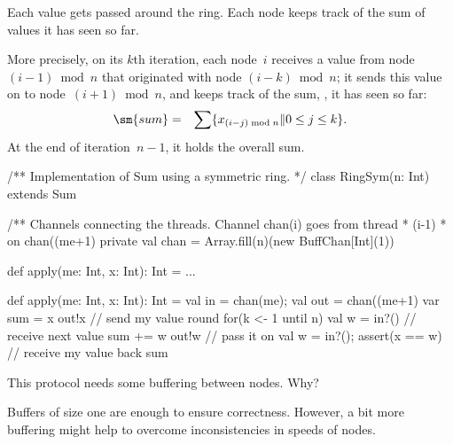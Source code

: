 \documentclass[notes,color]{sepslide0}
\def\set#1{\{#1\}}
\begin{document}
\begin{slide}

Each value gets passed around the ring.  Each node keeps track of the sum of
values it has seen so far.

More precisely, on its $k$th iteration, each node~$i$ receives a value
from node~$(i-1) \bmod n$ that originated with node $(i-k)\bmod n$; it
sends this value on to node~$(i+1)\bmod n$, and keeps track of the
sum, , it has seen so far:
%
\begin{eqnarray*}
\sm{sum} & = & \sum \set{x_{(i-j)\bmod n} \| 0 \le j \le k}.
\end{eqnarray*}
%
At the end of iteration~$n-1$, it holds the overall sum.
\end{slide}


\begin{slide}

\begin{scala}
/** Implementation of Sum using a symmetric ring. */
class RingSym(n: Int) extends Sum{
  /** Channels connecting the threads.  Channel chan(i) goes from thread
    * (i-1)%
    * on chan((me+1)%
  private val chan = Array.fill(n)(new BuffChan[Int](1))

  def apply(me: Int, x: Int): Int = ...
}
\end{scala}
\end{slide}


\begin{slide}

\begin{scala}
  def apply(me: Int, x: Int): Int = {
    val in = chan(me); val out = chan((me+1)%
    var sum = x
    out!x                 // send my value round
    for(k <- 1 until n){
      val w = in?()       // receive next value
      sum += w
      out!w               // pass it on
    }
    val w = in?(); assert(x == w) // receive my value back
    sum
  }
\end{scala}
\end{slide}



\begin{slide}

This protocol needs some buffering between nodes.  Why?

Buffers of size one are enough to ensure correctness.  However, a bit more
buffering might help to overcome inconsistencies in speeds of nodes.
\end{slide}
\end{document}

